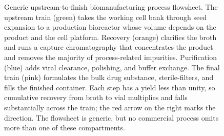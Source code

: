 \begin{figure}[htbp]
\caption{Generic upstream-to-finish biomanufacturing process flowsheet.
The upstream train (green) takes the working cell bank through seed
expansion to a production bioreactor whose volume depends on the
product and the cell platform. Recovery (orange) clarifies the broth
and runs a capture chromatography that concentrates the product and
removes the majority of process-related impurities. Purification
(blue) adds viral clearance, polishing, and buffer exchange. The final
train (pink) formulates the bulk drug substance, sterile-filters, and
fills the finished container. Each step has a yield less than unity,
so cumulative recovery from broth to vial multiplies and falls
substantially across the train; the red arrow on the right marks the
direction. The flowsheet is generic, but no commercial process omits
more than one of these compartments.}
\label{fig:vol06ch10:flowsheet}
\end{figure}
